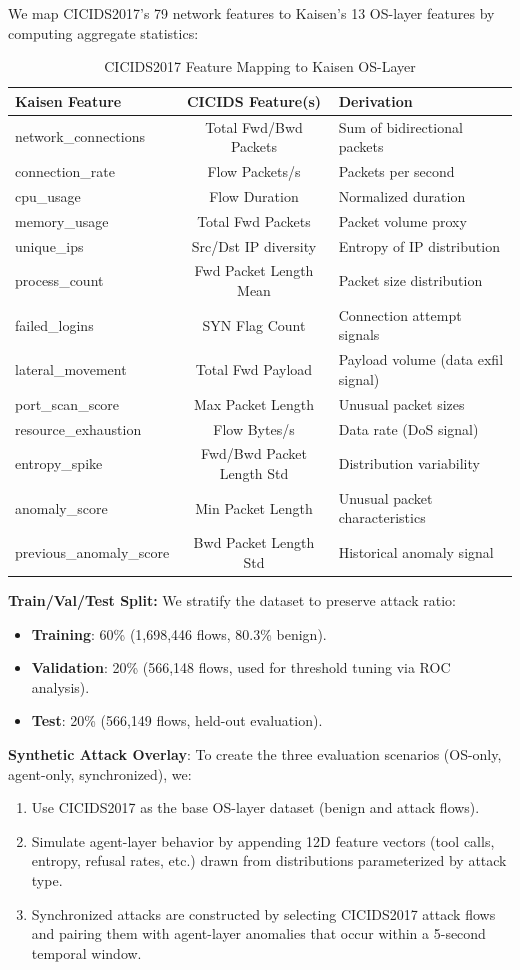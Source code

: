 \documentclass[conference]{IEEEtran}
\begin{document}
We map CICIDS2017's 79 network features to Kaisen's 13 OS-layer features by computing aggregate statistics:
\begin{table}[h]
\centering
\caption{CICIDS2017 Feature Mapping to Kaisen OS-Layer}
\label{tab:feature_mapping}
\begin{tabular}{lcl}
\toprule
Kaisen Feature & CICIDS Feature(s) & Derivation \\
\midrule
network\_connections & Total Fwd/Bwd Packets & Sum of bidirectional packets \\
connection\_rate & Flow Packets/s & Packets per second \\
cpu\_usage & Flow Duration & Normalized duration \\
memory\_usage & Total Fwd Packets & Packet volume proxy \\
unique\_ips & Src/Dst IP diversity & Entropy of IP distribution \\
process\_count & Fwd Packet Length Mean & Packet size distribution \\
failed\_logins & SYN Flag Count & Connection attempt signals \\
lateral\_movement & Total Fwd Payload & Payload volume (data exfil signal) \\
port\_scan\_score & Max Packet Length & Unusual packet sizes \\
resource\_exhaustion & Flow Bytes/s & Data rate (DoS signal) \\
entropy\_spike & Fwd/Bwd Packet Length Std & Distribution variability \\
anomaly\_score & Min Packet Length & Unusual packet characteristics \\
previous\_anomaly\_score & Bwd Packet Length Std & Historical anomaly signal \\
\bottomrule
\end{tabular}
\end{table}

\textbf{Train/Val/Test Split:} We stratify the dataset to preserve attack ratio:
\begin{itemize}
\item \textbf{Training}: 60\% (1,698,446 flows, 80.3\% benign).
\item \textbf{Validation}: 20\% (566,148 flows, used for threshold tuning via ROC analysis).
\item \textbf{Test}: 20\% (566,149 flows, held-out evaluation).
\end{itemize}

\textbf{Synthetic Attack Overlay}: To create the three evaluation scenarios (OS-only, agent-only, synchronized), we:
\begin{enumerate}
\item Use CICIDS2017 as the base OS-layer dataset (benign and attack flows).
\item Simulate agent-layer behavior by appending 12D feature vectors (tool calls, entropy, refusal rates, etc.) drawn from distributions parameterized by attack type.
\item Synchronized attacks are constructed by selecting CICIDS2017 attack flows and pairing them with agent-layer anomalies that occur within a 5-second temporal window.
\end{enumerate}
\end{document}
